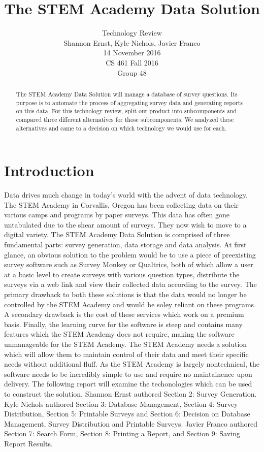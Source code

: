 \documentclass[letterpaper,10pt,serif, draftclsnofoot,onecolumn, compsoc, titlepage]{IEEEtran}
\title{The STEM Academy Data Solution}
\author{Technology Review \\ Shannon Ernst, Kyle Nichols, Javier Franco\\ 14 November 2016\\ CS 461 Fall 2016\\ Group 48}
\begin{document}
\maketitle
\begin{abstract}
The STEM Academy Data Solution will manage a database of survey questions.
Its purpose is to automate the process of aggregating survey data and generating reports on this data.
For this technology review, split our product into subcomponents and compared three different alternatives for those subcomponents.
We analyzed these alternatives and came to a decision on which technology we would use for each.
\end{abstract}

\newpage
\tableofcontents
\newpage

\section{Introduction}
Data drives much change in today's world with the advent of data technology. The STEM Academy in Corvallis,
 Oregon has been collecting data on their various camps and programs by paper surveys. This data has often 
gone untabulated due to the shear amount of surveys. They now wish to move to a digital variety.
 The STEM Academy Data Solution is comprised of three fundamental parts: survey generation, data storage and data analysis.
At first glance, an obvious solution to the problem would be to use a piece of preexisting survey software such as Survey Monkey \cite{surveyMonkey}
or Qualtrics\cite{qualtrics}, both of which allow a user at a basic level to create surveys with various question types, distribute the surveys 
via a web link and view their collected data according to the survey. The primary drawback to both these solutions is that the 
data would no longer be controlled by the STEM Academy and would be soley reliant on these programs. A secondary drawback
 is the cost of these services which work on a premium basis\cite{surveyMonkeyCost}. Finally, the learning curve for the software is steep and contains
many features which the STEM Academy does not require, making the software unmanageable for the STEM Academy. 
The STEM Academy needs a solution which will allow them to maintain control of their data and meet their specific needs without
additional fluff. As the STEM Academy is largely nontechnical, the software needs to be incredibly simple to use and require no 
maintainence upon delivery. The following report will examine the techonologies which can be used to construct the solution. Shannon Ernst authored Section 2: Survey Generation. Kyle Nichols authored Section 3: Database Management, Section 4: Survey Distribution, Section 5: Printable Surveys and Section 6: Decision on Database Management, Survey Distribution and Printable Surveys. Javier Franco authored Section 7: Search Form, Section 8: Printing a Report, and Section 9: Saving Report Results. 
\end{document}
